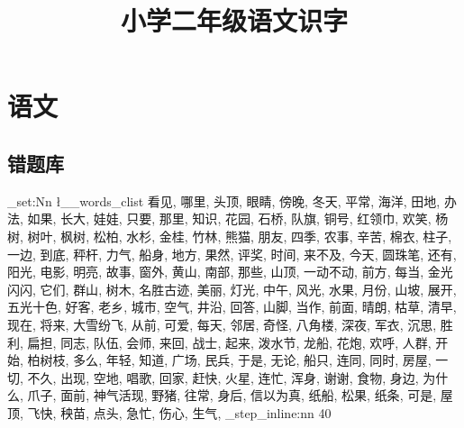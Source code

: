 \documentclass[scheme=chinese,a4paper,12pt]{ctexart}
\title{小学二年级语文识字}
\begin{document}
\maketitle
\section{语文}
\subsection{错题库}
\setlength{\parindent}{0pt}

\ExplSyntaxOn
\clist_set:Nn \l__words_clist
{
{看见},
{哪里},
{头顶},
{眼睛},
{傍晚},
{冬天},
{平常},
{海洋},
{田地},
{办法},
{如果},
{长大},
{娃娃},
{只要},
{那里},
{知识},
{花园},
{石桥},
{队旗},
{铜号},
{红领巾},
{欢笑},
{杨树},
{树叶},
{枫树},
{松柏},
{水杉},
{金桂},
{竹林},
{熊猫},
{朋友},
{四季},
{农事},
{辛苦},
{棉衣},
{柱子},
{一边},
{到底},
{秤杆},
{力气},
{船身},
{地方},
{果然},
{评奖},
{时间},
{来不及},
{今天},
{圆珠笔},
{还有},
{阳光},
{电影},
{明亮},
{故事},
{窗外},
{黄山},
{南部},
{那些},
{山顶},
{一动不动},
{前方},
{每当},
{金光闪闪},
{它们},
{群山},
{树木},
{名胜古迹},
{美丽},
{灯光},
{中午},
{风光},
{水果},
{月份},
{山坡},
{展开},
{五光十色},
{好客},
{老乡},
{城市},
{空气},
{井沿},
{回答},
{山脚},
{当作},
{前面},
{晴朗},
{枯草},
{清早},
{现在},
{将来},
{大雪纷飞},
{从前},
{可爱},
{每天},
{邻居},
{奇怪},
{八角楼},
{深夜},
{军衣},
{沉思},
{胜利},
{扁担},
{同志},
{队伍},
{会师},
{来回},
{战士},
{起来},
{泼水节},
{龙船},
{花炮},
{欢呼},
{人群},
{开始},
{柏树枝},
{多么},
{年轻},
{知道},
{广场},
{民兵},
{于是},
{无论},
{船只},
{连同},
{同时},
{房屋},
{一切},
{不久},
{出现},
{空地},
{唱歌},
{回家},
{赶快},
{火星},
{连忙},
{浑身},
{谢谢},
{食物},
{身边},
{为什么},
{爪子},
{面前},
{神气活现},
{野猪},
{往常},
{身后},
{信以为真},
{纸船},
{松果},
{纸条},
{可是},
{屋顶},
{飞快},
{秧苗},
{点头},
{急忙},
{伤心},
{生气},
}
\int_step_inline:nn {40}
{
\hspace{1cm}
}
\ExplSyntaxOff
\end{document}
